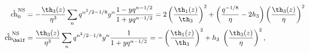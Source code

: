 \begin{equation} \label{NS-char}
  \begin{split}
    \hat{\rm ch}^{\rm NS}_0 &= -{\th_3(z)\over \eta^3} \sum_n
    q^{n^2/2-1/8} y^n {1-yq^{n-1/2} \over 1+yq^{n-1/2}} 
    = 2\left( \th_1(z)\over \th_3 \right)^2 + \left(
    {q^{-1/8}\over\eta} -2 h_3 \right) \left(
    \th_3(z)\over \eta \right)^2 \\
     \hat{\rm ch}^{\rm NS}_\half &= {\th_3(z)\over \eta^3} \sum_n
    q^{n^2/2-1/8} y^n {1 \over 1+yq^{n-1/2}} 
    = -\left( \th_1(z)\over \th_3 \right)^2 + h_3~\left(
    \th_3(z)\over \eta \right)^2 ,
  \end{split}
\end{equation}

